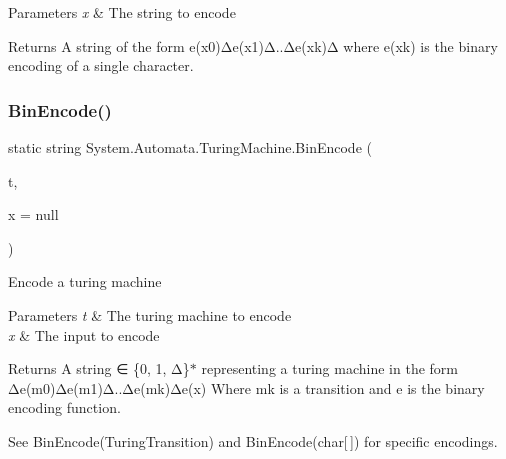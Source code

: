 \begin{DoxyParams}{Parameters}
{\em x} & The string to encode\\
\hline
\end{DoxyParams}
\begin{DoxyReturn}{Returns}
A string of the form e(x0)Δe(x1)Δ..Δe(xk)Δ where e(xk) is the binary encoding of a single character.
\end{DoxyReturn}
\mbox{\label{class_system_1_1_automata_1_1_turing_machine_a46274b3df870b1f350b8067e4eda77d9}} 
\subsubsection{\texorpdfstring{Bin\+Encode()}{BinEncode()}\hspace{0.1cm}{\footnotesize\ttfamily [5/6]}}
{\footnotesize\ttfamily static string System.\+Automata.\+Turing\+Machine.\+Bin\+Encode (\begin{DoxyParamCaption}\item[{\mbox{\hyperlink{class_system_1_1_automata_1_1_turing_machine}{Turing\+Machine}}}]{t,  }\item[{char \mbox{[}$\,$\mbox{]}}]{x = {\ttfamily null} }\end{DoxyParamCaption})\hspace{0.3cm}{\ttfamily [static]}}



Encode a turing machine 


\begin{DoxyParams}{Parameters}
{\em t} & The turing machine to encode\\
\hline
{\em x} & The input to encode\\
\hline
\end{DoxyParams}
\begin{DoxyReturn}{Returns}
A string ∈ \{0, 1, Δ\}$\ast$ representing a turing machine in the form Δe(m0)Δe(m1)Δ..Δe(mk)Δe(x) Where mk is a transition and e is the binary encoding function. 
\end{DoxyReturn}


See Bin\+Encode(\+Turing\+Transition) and Bin\+Encode(char\mbox{[}$\,$\mbox{]}) for specific encodings.\mbox{\label{class_system_1_1_automata_1_1_turing_machine_ae14f5c2439f706832f06cfc712e27b93}} 
